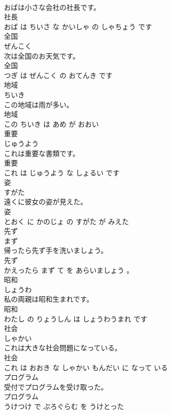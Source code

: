 \documentclass[8pt]{extreport}
\begin{document}
\begin{CJK}{UTF8}{min}
\\	おばは小さな会社の社長です。	
\\	社長 
\\	おば は ちいさ な かいしゃ の しゃちょう です			
\\	全国	
\\	ぜんこく			
\\	次は全国のお天気です。	
\\	全国 
\\	つぎ は ぜんこく の おてんき です			
\\	地域	
\\	ちいき			
\\	この地域は雨が多い。	
\\	地域 
\\	この ちいき は あめ が おおい			
\\	重要	
\\	じゅうよう			
\\	これは重要な書類です。	
\\	重要 
\\	これ は じゅうよう な しょるい です			
\\	姿	
\\	すがた			
\\	遠くに彼女の姿が見えた。	
\\	姿 
\\	とおく に かのじょ の すがた が みえた			
\\	先ず	
\\	まず			
\\	帰ったら先ず手を洗いましょう。	
\\	先ず 
\\	かえったら まず て を あらいましょう 。			
\\	昭和	
\\	しょうわ			
\\	私の両親は昭和生まれです。	
\\	昭和 
\\	わたし の りょうしん は しょうわうまれ です			
\\	社会	
\\	しゃかい			
\\	これは大きな社会問題になっている。	
\\	社会 
\\	これ は おおき な しゃかい もんだい に なって いる			
\\	プログラム	
\\	受付でプログラムを受け取った。	
\\	プログラム 
\\	うけつけ で ぷろぐらむ を うけとった			

\end{CJK}
\end{document}
